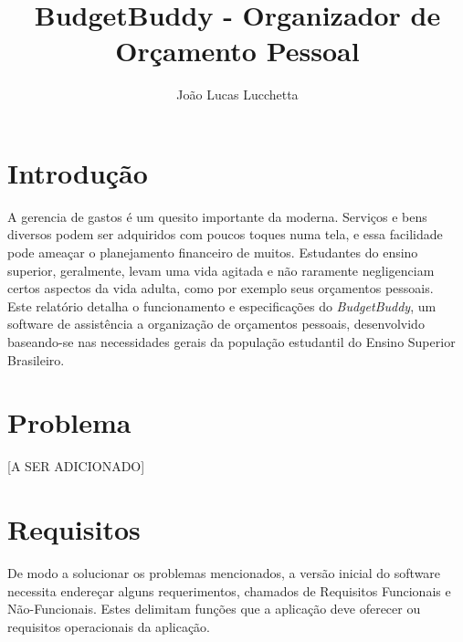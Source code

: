 \documentclass[
	12pt,				%
	oneside,			%
	a4paper,			%
	english,			%
	brazil,				%
	]{abntex2}
\title{BudgetBuddy - Organizador de Orçamento Pessoal}
\author{João Lucas Lucchetta}
\begin{document}
\maketitle

\begin{abstract}
\end{abstract}

\chapter*{Introdução}
A gerencia de gastos é um quesito importante da moderna. Serviços e bens diversos podem ser adquiridos com poucos toques numa tela,
e essa facilidade pode ameaçar o planejamento financeiro de muitos. Estudantes do ensino superior, geralmente, levam uma vida agitada
e não raramente negligenciam certos aspectos da vida adulta, como por exemplo seus orçamentos pessoais. \\ 
Este relatório detalha o funcionamento e especificações do \textit{BudgetBuddy}, um software de assistência a organização de orçamentos 
pessoais, desenvolvido baseando-se nas necessidades gerais da população estudantil do Ensino Superior Brasileiro.


\chapter{Problema}
[A SER ADICIONADO]
\chapter{Requisitos}
De modo a solucionar os problemas mencionados, a versão inicial do software necessita endereçar alguns requerimentos, chamados de Requisitos Funcionais e Não-Funcionais. Estes delimitam funções que a aplicação deve oferecer ou requisitos operacionais da aplicação.
\end{document}
